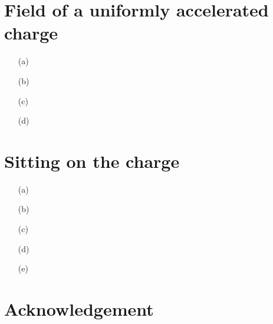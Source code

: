 \documentclass[10pt, a4paper]{article}
\begin{document}
\section{Field of a uniformly accelerated charge}
\begin{enumerate}
  \item[(a)]
  \item[(b)] 
  \item[(c)]
  \item[(d)]
\end{enumerate}

\section{Sitting on the charge}
\begin{enumerate}
  \item[(a)]
  \item[(b)] 
  \item[(c)]
  \item[(d)]
  \item[(e)]   
\end{enumerate}  

\section{Acknowledgement}



\makereferences


\end{document}
